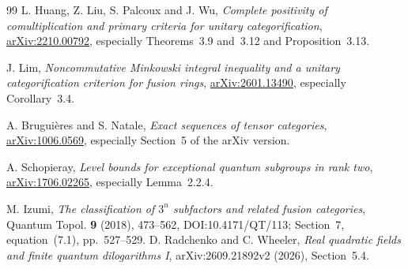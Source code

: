 \begin{thebibliography}{99}
L. Huang, Z. Liu, S. Palcoux and J. Wu,
\emph{Complete positivity of comultiplication and primary criteria for
unitary categorification},
\href{https://arxiv.org/abs/2210.00792}{arXiv:2210.00792},
especially Theorems~3.9 and~3.12 and Proposition~3.13.

J. Lim,
\emph{Noncommutative Minkowski integral inequality and a unitary
categorification criterion for fusion rings},
\href{https://arxiv.org/abs/2601.13490}{arXiv:2601.13490},
especially Corollary~3.4.

A. Brugui\`eres and S. Natale,
\emph{Exact sequences of tensor categories},
\href{https://arxiv.org/abs/1006.0569}{arXiv:1006.0569},
especially Section~5 of the arXiv version.

A. Schopieray,
\emph{Level bounds for exceptional quantum subgroups in rank two},
\href{https://arxiv.org/abs/1706.02265}{arXiv:1706.02265},
especially Lemma~2.2.4.

M. Izumi, \emph{The classification of $3^n$ subfactors and related fusion categories}, Quantum Topol. \textbf{9} (2018), 473--562, DOI:10.4171/QT/113; Section~7, equation~(7.1), pp.~527--529.
D. Radchenko and C. Wheeler,
\emph{Real quadratic fields and finite quantum dilogarithms I},
arXiv:2609.21892v2 (2026), Section~5.4.
\end{thebibliography}

